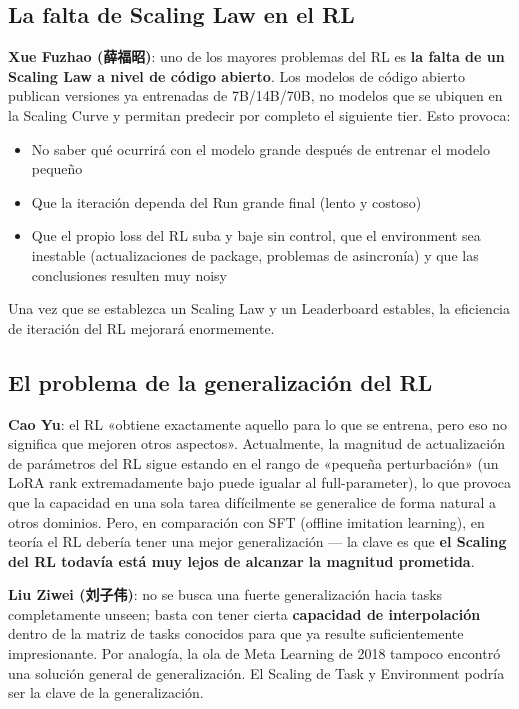 \subsection{La falta de Scaling Law en el RL}

\textbf{Xue Fuzhao (薛福昭)}: uno de los mayores problemas del RL es \textbf{la falta de un Scaling Law a nivel de código abierto}. Los modelos de código abierto publican versiones ya entrenadas de 7B/14B/70B, no modelos que se ubiquen en la Scaling Curve y permitan predecir por completo el siguiente tier. Esto provoca:
\begin{itemize}
  \item No saber qué ocurrirá con el modelo grande después de entrenar el modelo pequeño
  \item Que la iteración dependa del Run grande final (lento y costoso)
  \item Que el propio loss del RL suba y baje sin control, que el environment sea inestable (actualizaciones de package, problemas de asincronía) y que las conclusiones resulten muy noisy
\end{itemize}
Una vez que se establezca un Scaling Law y un Leaderboard estables, la eficiencia de iteración del RL mejorará enormemente.

\subsection{El problema de la generalización del RL}

\textbf{Cao Yu}: el RL «obtiene exactamente aquello para lo que se entrena, pero eso no significa que mejoren otros aspectos». Actualmente, la magnitud de actualización de parámetros del RL sigue estando en el rango de «pequeña perturbación» (un LoRA rank extremadamente bajo puede igualar al full-parameter), lo que provoca que la capacidad en una sola tarea difícilmente se generalice de forma natural a otros dominios. Pero, en comparación con SFT (offline imitation learning), en teoría el RL debería tener una mejor generalización — la clave es que \textbf{el Scaling del RL todavía está muy lejos de alcanzar la magnitud prometida}.

\textbf{Liu Ziwei (刘子伟)}: no se busca una fuerte generalización hacia tasks completamente unseen; basta con tener cierta \textbf{capacidad de interpolación} dentro de la matriz de tasks conocidos para que ya resulte suficientemente impresionante. Por analogía, la ola de Meta Learning de 2018 tampoco encontró una solución general de generalización. El Scaling de Task y Environment podría ser la clave de la generalización.


